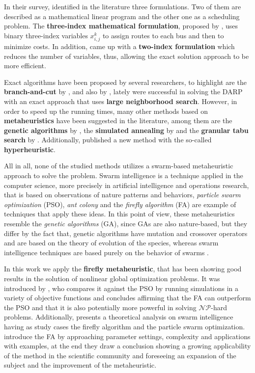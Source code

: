 \documentclass[tuberlin,cic,tc,openright,english,noabntcite,oneside]{iiufrgs}
\begin{document}
In their survey, \textcite{cordeau_dial--ride_2007} identified in the literature three formulations. Two of them are described as a mathematical linear program and the other one as a scheduling problem. The \textbf{three-index mathematical formulation}, proposed by \textcite{cordeau_branch-and-cut_2006}, uses binary three-index variables $x_{i,j}^{k}$ to assign routes to each bus and then to minimize costs. In addition, \textcite{ropke_models_2007} came up with a \textbf{two-index formulation} which reduces the number of variables, thus, allowing the exact solution approach to be more efficient.

Exact algorithms have been proposed by several researchers, to highlight are the \textbf{branch-and-cut} by \textcite{cordeau_branch-and-cut_2006}, and also by \textcite{ropke_models_2007}, lately \textcite{parragh_hybrid_2013} were successful in solving the DARP with an exact approach that uses \textbf{large neighborhood search}. However, in order to speed up the running times, many other methods based on \textbf{metaheuristics} have been suggested in the literature, among them are the \textbf{genetic algorithms} by \textcite{jorgensen_solving_2007}, the \textbf{simulated annealing} by \textcite{zidi_multi-objective_2012} and the \textbf{granular tabu search} by \textcite{kirchler_granular_2013}. Additionally, \textcite{urra_hyperheuristic_2015} published a new method with the so-called \textbf{hyperheuristic}.

All in all, none of the studied methods utilizes a swarm-based metaheuristic approach to solve the problem. Swarm intelligence is a technique applied in the computer science, more precisely in artificial intelligence and operations research, that is based on observations of nature patterns and behaviors, \emph{particle swarm optimization} (PSO), \emph{ant colony} and the \emph{firefly algorithm} (FA) are example of techniques that apply these ideas. In this point of view, these metaheuristics resemble the \emph{genetic algorithms} (GA), since GAs are also nature-based, but they differ by the fact that, genetic algorithms have mutation and crossover operators and are based on the theory of evolution of the species, whereas swarm intelligence techniques are based purely on the behavior of swarms \parencite[p. 189-190]{yang_efficiency_2012}.

In this work we apply the \textbf{firefly metaheuristic}, that has been showing good results in the solution of nonlinear global optimization problems. It was introduced by \textcite{yang_firefly_2009}, who compares it against the PSO by running simulations in a variety of objective functions and concludes affirming that the FA can outperform the PSO and that it is also potentially more powerful in solving $\mathcal{NP}$-hard problems. Additionally, \textcite{yang_efficiency_2012} presents a theoretical analysis on swarm intelligence having as study cases the firefly algorithm and the particle swarm optimization. \textcite{yang_firefly_2013} introduce the FA by approaching parameter settings, complexity and applications with examples, at the end they draw a conclusion showing a growing applicability of the method in the scientific community and foreseeing an expansion of the subject and the improvement of the metaheuristic.
\end{document}

